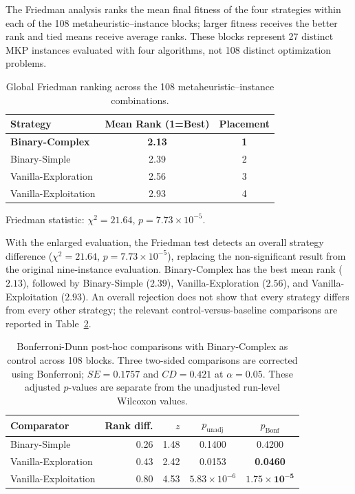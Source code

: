 \documentclass[journal,article,submit,moreauthors]{Definitions/mdpi}
\begin{document}
The Friedman analysis ranks the mean final fitness of the four strategies
within each of the 108 metaheuristic--instance blocks; larger fitness
receives the better rank and tied means receive average ranks.
These blocks represent 27 distinct MKP instances evaluated with four
algorithms, not 108 distinct optimization problems.

\begin{table}[htbp]
  \centering
  \caption{Global Friedman ranking across the 108 metaheuristic--instance combinations.}
  \label{tab:friedman_ranking}
  \begin{tabular}{lcc}
    \toprule
    \textbf{Strategy} &
    \textbf{Mean Rank (1=Best)} &
    \textbf{Placement} \\
    \midrule
    \textbf{Binary-Complex}          & \textbf{2.13} & \textbf{1} \\
    Binary-Simple                    &   2.39 &  2 \\
    Vanilla-Exploration              &   2.56 &  3 \\
    Vanilla-Exploitation             &   2.93 &  4 \\
    \bottomrule
  \end{tabular}
  \vspace{1ex}

  \footnotesize Friedman statistic:
  $\chi^2=21.64$, $p=7.73\times10^{-5}$.
\end{table}

With the enlarged evaluation, the Friedman test detects an overall
strategy difference ($\chi^2=21.64$, $p=7.73\times10^{-5}$), replacing
the non-significant result from the original nine-instance evaluation.
Binary-Complex has the best mean rank ($2.13$), followed by Binary-Simple
($2.39$), Vanilla-Exploration ($2.56$), and Vanilla-Exploitation ($2.93$).
An overall rejection does not show that every strategy differs from every
other strategy; the relevant control-versus-baseline comparisons are
reported in Table~\ref{tab:bonferroni_posthoc_all}.

\begin{table}[htbp]
  \centering
  \small
  \caption{Bonferroni-Dunn post-hoc comparisons with Binary-Complex as
  control across 108 blocks. Three two-sided comparisons are corrected
  using Bonferroni; $SE=0.1757$ and $CD=0.421$ at $\alpha=0.05$.
  These adjusted $p$-values are separate from the unadjusted
  run-level Wilcoxon values.}
  \label{tab:bonferroni_posthoc_all}
  \begin{tabular}{lrrcc}
    \toprule
    Comparator & Rank diff. & $z$ & $p_{\mathrm{unadj}}$ & $p_{\mathrm{Bonf}}$ \\
    \midrule
    Binary-Simple & 0.26 & 1.48 & 0.1400 & 0.4200 \\
    Vanilla-Exploration & 0.43 & 2.42 & 0.0153 & \textbf{0.0460} \\
    Vanilla-Exploitation & 0.80 & 4.53 & $5.83\times10^{-6}$ &
    $\mathbf{1.75\times10^{-5}}$ \\
    \bottomrule
  \end{tabular}
\end{table}
\end{document}
